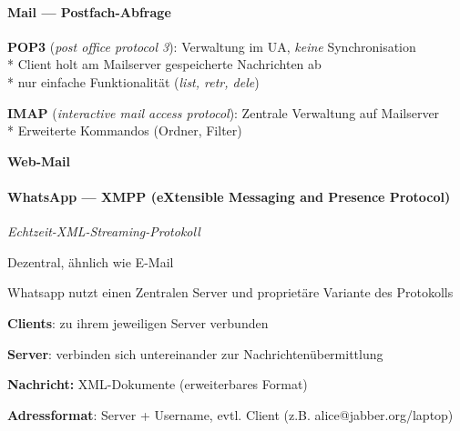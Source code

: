 \paragraph{Mail --- Postfach-Abfrage}
\begin{items}
  \item \textbf{POP3} (\emph{post office protocol 3}): Verwaltung im UA, \emph{keine} Synchronisation\\*
    Client holt am Mailserver gespeicherte Nachrichten ab\\*
    nur einfache Funktionalität (\textit{list, retr, dele})
  \item \textbf{IMAP} (\emph{interactive mail access protocol}): Zentrale Verwaltung auf Mailserver\\*
    	Erweiterte Kommandos (Ordner, Filter)
   \item \textbf{Web-Mail}
\end{items}

\paragraph{WhatsApp --- XMPP (eXtensible Messaging and Presence Protocol)}
\begin{items}
  \item \emph{Echtzeit-XML-Streaming-Protokoll}
  \item Dezentral, ähnlich wie E-Mail
  \item Whatsapp nutzt einen Zentralen Server und proprietäre Variante des Protokolls
  \item \textbf{Clients}: zu ihrem jeweiligen Server verbunden
  \item \textbf{Server}: verbinden sich untereinander zur Nachrichtenübermittlung
  \item \textbf{Nachricht:} XML-Dokumente (erweiterbares Format)
  \item \textbf{Adressformat}: Server + Username, evtl. Client (z.B. alice@jabber.org/laptop)
\end{items}

